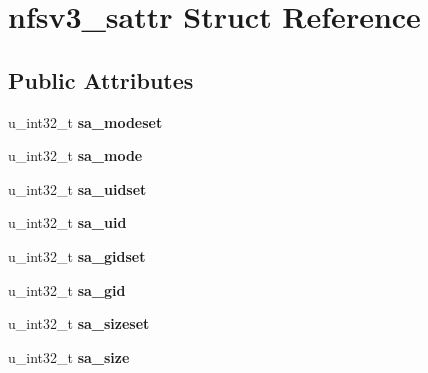 \hypertarget{structnfsv3__sattr}{
\section{nfsv3\_\-sattr Struct Reference}
\label{structnfsv3__sattr}
}
\subsection*{Public Attributes}
\begin{DoxyCompactItemize}
\item 
\hypertarget{structnfsv3__sattr_ad184468a5ee45239b92152d1b52cc487}{
u\_\-int32\_\-t {\bfseries sa\_\-modeset}}
\label{structnfsv3__sattr_ad184468a5ee45239b92152d1b52cc487}

\item 
\hypertarget{structnfsv3__sattr_aab2441a53bcb55ee3904c77d1c72e221}{
u\_\-int32\_\-t {\bfseries sa\_\-mode}}
\label{structnfsv3__sattr_aab2441a53bcb55ee3904c77d1c72e221}

\item 
\hypertarget{structnfsv3__sattr_a626891d079e8f66b3ae98ec41a541126}{
u\_\-int32\_\-t {\bfseries sa\_\-uidset}}
\label{structnfsv3__sattr_a626891d079e8f66b3ae98ec41a541126}

\item 
\hypertarget{structnfsv3__sattr_af1aee0b3a4dc389a9e837fd83e3d61b8}{
u\_\-int32\_\-t {\bfseries sa\_\-uid}}
\label{structnfsv3__sattr_af1aee0b3a4dc389a9e837fd83e3d61b8}

\item 
\hypertarget{structnfsv3__sattr_a811d85ecae02fe0f95f67f8b4caba8a6}{
u\_\-int32\_\-t {\bfseries sa\_\-gidset}}
\label{structnfsv3__sattr_a811d85ecae02fe0f95f67f8b4caba8a6}

\item 
\hypertarget{structnfsv3__sattr_af15edb5dd4447e36e102b86cdbee751c}{
u\_\-int32\_\-t {\bfseries sa\_\-gid}}
\label{structnfsv3__sattr_af15edb5dd4447e36e102b86cdbee751c}

\item 
\hypertarget{structnfsv3__sattr_aa1a495e20ac3c25a5ee5628840aaa10a}{
u\_\-int32\_\-t {\bfseries sa\_\-sizeset}}
\label{structnfsv3__sattr_aa1a495e20ac3c25a5ee5628840aaa10a}

\item 
\hypertarget{structnfsv3__sattr_a4ef98daa4ac6c6ef9115390498d2533d}{
u\_\-int32\_\-t {\bfseries sa\_\-size}}
\label{structnfsv3__sattr_a4ef98daa4ac6c6ef9115390498d2533d}


\end{DoxyCompactItemize}
